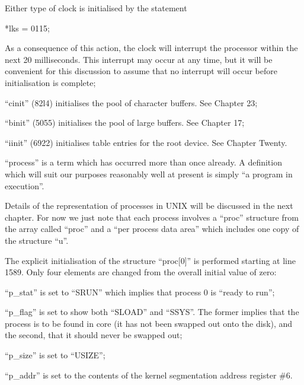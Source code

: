 \bd
\item[1607:] Either type of clock is initialised by the statement

*lks = 0115;

As a consequence of this action,
the clock will interrupt the processor within the next 20
 milliseconds. This interrupt may
occur at any time, but it will be
convenient for this discussion to
assume that no interrupt will
occur before initialisation is
complete;

\item[1613:] ``cinit'' (82l4) initialises the
 pool of character buffers. See
 Chapter 23;

\item[1614:] ``binit'' (5055) initialises
 the pool of large buffers. See Chapter 17;

\item[1615:] ``iinit'' (6922) initialises table
 entries for the root device. See
 Chapter Twenty.
\ed


``process'' is a term which has occurred
more than once already. A definition
which will suit our purposes reasonably
well at present is simply ``a program in
execution''.


Details of the representation of
processes in UNIX will be discussed in
the next chapter. For now we just note
that each process involves a ``proc''
structure from the array called ``proc''
and a ``per process data area'' which
includes one copy of the structure ``u''.



The explicit initialisation of the
structure ``proc[0]'' is performed starting at line 1589. Only four elements
are changed from the overall initial
value of zero:

\bd
\item[(a)] ``p\_stat'' is set to ``SRUN'' which
 implies that process 0 is
 ``ready to run'';

\item[(b)] ``p\_flag'' is set to show both
 ``SLOAD'' and ``SSYS''. The former
 implies that the process is to
 be found in core (it has not
 been swapped out onto the disk),
 and the second, that it should
 never be swapped out;

\item[(c)] ``p\_size'' is set to ``USIZE'';

\item[(d)] ``p\_addr'' is set to the contents
 of the kernel segmentation address register \#6.
\ed


